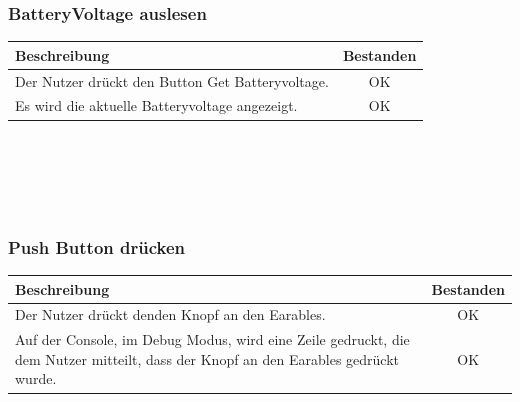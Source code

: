 \documentclass[a4paper,12pt]{article}
\newcommand{\testok}[0]{
	\cellcolor{green!25} OK
}
\begin{document}
\subsubsection{BatteryVoltage auslesen}
\begin{tabular}{ | p{12cm} | c| }
	\hline
	\textbf{Beschreibung} & \textbf{Bestanden}\\
	\hline
	Der Nutzer drückt den Button \glqq{}Get Batteryvoltage\grqq{}. & \testok \\
	\hline
	Es wird die aktuelle Batteryvoltage angezeigt. & \testok \\
	\hline
\end{tabular}
\\ \\ \\ \\
\begin{figure}[h]
	\centering
\end{figure}
\FloatBarrier

\subsubsection{Push Button drücken}
\begin{tabular}{ | p{12cm} | c| }
	\hline
	\textbf{Beschreibung} & \textbf{Bestanden}\\
	\hline
	Der Nutzer drückt denden Knopf an den Earables. & \testok \\
	\hline
	Auf der Console, im Debug Modus, wird eine Zeile gedruckt, die dem Nutzer mitteilt, dass der Knopf an den Earables gedrückt wurde. & \testok \\
	\hline
\end{tabular}
\end{document}
